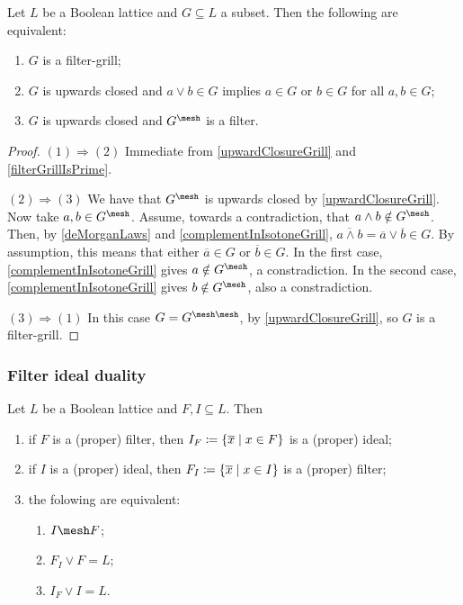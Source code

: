 \begin{proposition} \label{filterGrillEquivalences}
Let $L$ be a Boolean lattice and $G\subseteq L$ a subset. Then the following are equivalent:
\begin{enumerate}
\item $G$ is a filter-grill;
\item $G$ is upwards closed and $a\vee b\in G$ implies $a\in G$ or $b\in G$ for all $a,b\in G$;
\item $G$ is upwards closed and $G^\mesh$ is a filter.
\end{enumerate}
\end{proposition}
\begin{proof}
$(1) \Rightarrow (2)$ Immediate from \ref{upwardClosureGrill} and \ref{filterGrillIsPrime}.

$(2) \Rightarrow (3)$ We have that $G^\mesh$ is upwards closed by \ref{upwardClosureGrill}. Now take $a,b\in G^\mesh$. Assume, towards a contradiction, that $a\wedge b\notin G^\mesh$. Then, by \ref{deMorganLaws} and \ref{complementInIsotoneGrill}, $\overline{a\wedge b} = \overline{a}\vee\overline{b} \in G$. By assumption, this means that either $\overline{a}\in G$ or $\overline{b}\in G$. In the first case, \ref{complementInIsotoneGrill} gives $a\notin G^\mesh$, a constradiction. In the second case, \ref{complementInIsotoneGrill} gives $b\notin G^\mesh$, also a constradiction.

$(3) \Rightarrow (1)$ In this case $G = G^{\mesh\mesh}$, by \ref{upwardClosureGrill}, so $G$ is a filter-grill.
\end{proof}

\subsubsection{Filter ideal duality}
\begin{proposition} \label{filterIdealDuality}
Let $L$ be a Boolean lattice and $F,I\subseteq L$. Then
\begin{enumerate}
\item if $F$ is a (proper) filter, then $I_F \defeq \setbuilder{\overline{x}}{x\in F}$ is a (proper) ideal;
\item if $I$ is a (proper) ideal, then $F_I \defeq \setbuilder{\overline{x}}{x\in I}$ is a (proper) filter;
\item the folowing are equivalent:
\begin{enumerate}
\item $I \mesh F$;
\item $F_I \vee F = L$;
\item $I_F \vee I = L$.
\end{enumerate}
\end{enumerate}
\end{proposition}

